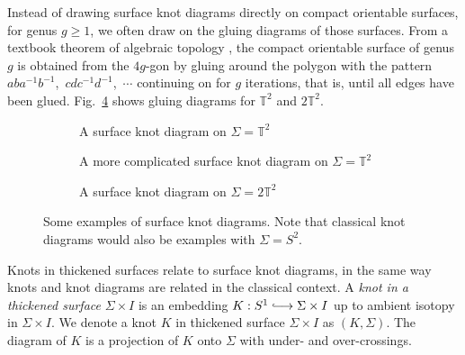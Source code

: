 \documentclass[12pt]{report}
\newcommand{\T}{\mathbb{T}}
\newcommand{\inject}{\lhook\joinrel\longrightarrow}
\begin{document}
Instead of drawing surface knot diagrams directly on compact orientable surfaces, for genus $g \geq 1$, we often draw on the gluing diagrams of those surfaces. From a textbook theorem of algebraic topology \parencite[Chapter 0]{algebraic-topology}, the compact orientable surface of genus $g$ is obtained from the $4g$-gon by gluing around the polygon with the pattern $aba^{-1}b^{-1}$,~$cdc^{-1}d^{-1}$,~$\cdots$ continuing on for $g$ iterations, that is, until all edges have been glued. Fig.~\ref{fig:surface-knot-diagram-examples} shows gluing diagrams for $\T^{2}$ and $2\T^{2}$.
\begin{figure}[hbt!]
	\centering
	\hspace*{\fill}
	\begin{subfigure}[b]{0.3 \textwidth}
		\centering
		\def\svgscale{0.26}
		
		\caption{A surface knot diagram on $\Sigma = \T^{2}$}
		\label{fig:torus-unknot}
	\end{subfigure}
	\hspace*{\fill}
	\begin{subfigure}[b]{0.3 \textwidth}
		\centering
		\def\svgscale{0.26}
		
		\caption{A more complicated surface knot diagram on $\Sigma = \T^{2}$}
		\label{fig:torus-vknot}
	\end{subfigure}
	\hspace*{\fill}
	\begin{subfigure}[b]{0.3 \textwidth}
		\centering
		\def\svgscale{0.24}
		
		\caption{A surface knot diagram on $\Sigma = 2\T^{2}$}
		\label{fig:2torus-vknot}
	\end{subfigure}
	\caption{Some examples of surface knot diagrams. Note that classical knot diagrams would also be examples with $\Sigma = S^{2}$.}
	\label{fig:surface-knot-diagram-examples}
	\hspace*{\fill} 
\end{figure}

Knots in thickened surfaces relate to surface knot diagrams, in the same way knots and knot diagrams are related in the classical context. A \textit{knot in a thickened surface} $\Sigma \times I$ is an embedding $K:S^{1} \inject \Sigma \times I$ up to ambient isotopy in $\Sigma \times I$. We denote a knot $K$ in thickened surface $\Sigma \times I$ as $(K, \Sigma)$. The diagram of $K$ is a projection of $K$ onto $\Sigma$ with under- and over-crossings.
\end{document}
